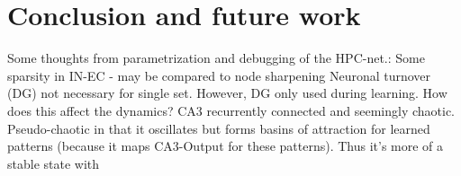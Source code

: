 
\chapter{Conclusion and future work}\label{chpt:conclusion}

Some thoughts from parametrization and debugging of the HPC-net.:
Some sparsity in IN-EC - may be compared to node sharpening
Neuronal turnover (DG) not necessary for single set. However, DG only used during learning. How does this affect the dynamics?
CA3 recurrently connected and seemingly chaotic. Pseudo-chaotic in that it oscillates but forms basins of attraction for learned patterns (because it maps CA3-Output for these patterns). Thus it’s more of a stable state with 


\cleardoublepage